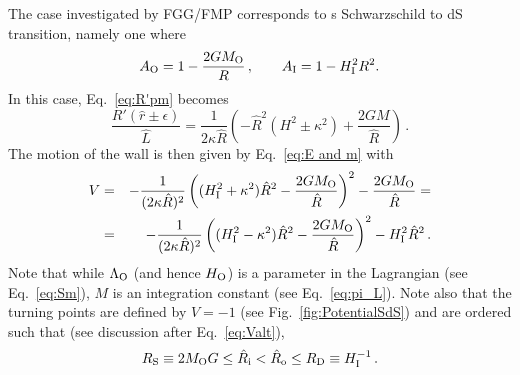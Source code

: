 \documentclass[11pt,a4paper]{article}
\begin{document}
The case  investigated by FGG/FMP corresponds to s Schwarzschild to dS transition, namely one where
\begin{equation}
A_{{\rm O}} = 1 - \frac{2GM_{{\rm O}}}{R}\,, \qquad A_{{\rm I}}=1-H_{{\rm I}}^{2}R^{2}.
\end{equation}
In this case, Eq.~\eqref{eq:R'pm} becomes
\begin{equation}
\frac{R'(\hat{r}\pm\epsilon)}{\hat{L}}=\frac{1}{2\kappa\hat{R}}\left(-\hat{R}^{2}(H^{2}\pm\kappa^{2})+\frac{2GM}{\hat{R}}\right)\,.\label{eq:R'+-}
\end{equation}
The motion of the wall is then given by Eq.~\eqref{eq:E and m} with
\begin{eqnarray}
V & = & -\frac{1}{(2\kappa\hat{R})^{2}}\left((H_{{\rm
I}}^{2}+\kappa^{2})\hat{R}^{2}-\frac{2GM_{{\rm
O}}}{\hat{R}}\right)^{2}-\frac{2GM_{{\rm O}}}{\hat{R}} = \label{eq:VBGG}\\
 & = &
-\frac{1}{(2\kappa\hat{R})^{2}}\left((H_{\rm I}^{2}-\kappa^{2})\hat{R}^{2}-\frac{2GM_{{\rm
O}}}{\hat{R}}\right)^{2}-H_{{\rm I}}^{2}\hat{R}^{2} \,.\label{eq:VBGGalt}
\end{eqnarray}
Note that while $\Lambda_{{\rm O}}$ (and hence $H_{{\rm O}}$) is
a parameter in the Lagrangian (see Eq.~\eqref{eq:Sm}), $M$ is an integration constant (see Eq.~\eqref{eq:pi_L}). Note also that the turning points are defined by $V = - 1$ (see Fig.~\ref{fig:PotentialSdS}) and are ordered such that (see discussion after Eq.~\eqref{eq:Valt}),
\begin{equation}
R_{\rm S}\equiv 2M_{{\rm O}}G\le\hat{R}_{{\rm i}} < \hat{R}_{{\rm o}} \le R_{\rm D} \equiv H_{{\rm I}}^{-1} \,.
\end{equation}
\end{document}
